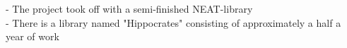 - The project took off with a semi-finished NEAT-library\\
- There is a library named "Hippocrates" consisting of approximately a half a year of work

